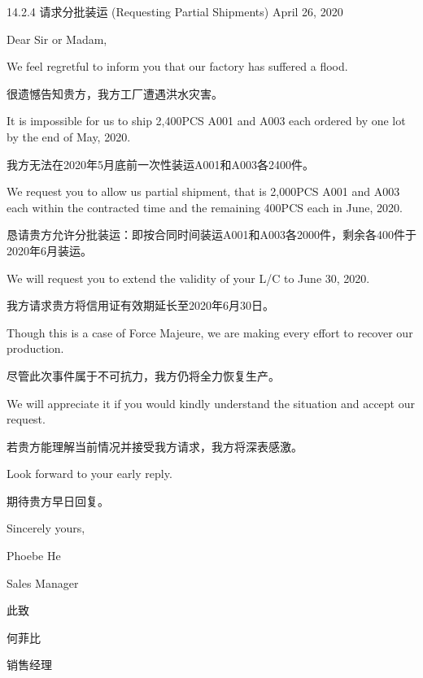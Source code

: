 \documentclass[12pt]{beamer}
\begin{document}
    \begin{frame}[allowframebreaks]{14.2.4 请求分批装运 (Requesting Partial Shipments)}
    \textcolor{myblue}{April 26, 2020}
    
    \textcolor{myblue}{Dear Sir or Madam,}
    
    \vspace{0.2cm}
    \textcolor{myblue}{We feel regretful to inform you that our factory has suffered a flood.}
    
    \textcolor{myred}{很遗憾告知贵方，我方工厂遭遇洪水灾害。}
    
    \vspace{0.2cm}
    \textcolor{myblue}{It is impossible for us to ship 2,400PCS A001 and A003 each ordered by one lot by the end of May, 2020.}
    
    \textcolor{myred}{我方无法在2020年5月底前一次性装运A001和A003各2400件。}
    
    \framebreak
    
    \textcolor{myblue}{We request you to allow us partial shipment, that is 2,000PCS A001 and A003 each within the contracted time and the remaining 400PCS each in June, 2020.}
    
    \textcolor{myred}{恳请贵方允许分批装运：即按合同时间装运A001和A003各2000件，剩余各400件于2020年6月装运。}
    
    \vspace{0.2cm}
    \textcolor{myblue}{We will request you to extend the validity of your L/C to June 30, 2020.}
    
    \textcolor{myred}{我方请求贵方将信用证有效期延长至2020年6月30日。}
    
    \vspace{0.2cm}
    \textcolor{myblue}{Though this is a case of Force Majeure, we are making every effort to recover our production.}
    
    \textcolor{myred}{尽管此次事件属于不可抗力，我方仍将全力恢复生产。}
    
    \framebreak
    
    \textcolor{myblue}{We will appreciate it if you would kindly understand the situation and accept our request.}
    
    \textcolor{myred}{若贵方能理解当前情况并接受我方请求，我方将深表感激。}
    
    \vspace{0.2cm}
    \textcolor{myblue}{Look forward to your early reply.}
    
    \textcolor{myred}{期待贵方早日回复。}
    
    \vspace{0.2cm}
    \textcolor{myblue}{Sincerely yours,}
    
    \textcolor{myblue}{Phoebe He}
    
    \textcolor{myblue}{Sales Manager}
    
    \textcolor{myred}{此致}
    
    \textcolor{myred}{何菲比}
    
    \textcolor{myred}{销售经理}
    \end{frame}
\end{document}
